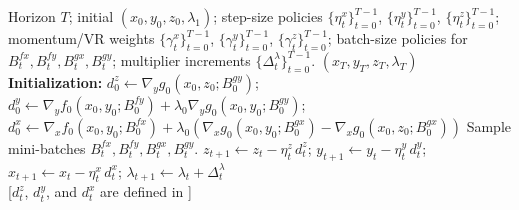\documentclass{uai2026} %
\begin{document}
\begin{algorithm}[t]
\caption{Variance-Reduced SF$^2$OBO (VR--SF$^2$OBO)}
\label{alg:vr-sf2obo}
\begin{algorithmic}[1]
  \Input Horizon $T$; initial $(x_0,y_0,z_0,\lambda_1)$; step-size policies $\{\eta_t^x\}_{t=0}^{T-1}$, $\{\eta_t^y\}_{t=0}^{T-1}$, $\{\eta_t^z\}_{t=0}^{T-1}$; momentum/VR weights $\{\gamma_t^x\}_{t=0}^{T-1}$, $\{\gamma_t^y\}_{t=0}^{T-1}$, $\{\gamma_t^z\}_{t=0}^{T-1}$; batch-size policies for $B_t^{fx},B_t^{fy},B_t^{gx},B_t^{gy}$; multiplier increments $\{\Delta_t^\lambda\}_{t=0}^{T-1}$.
  \Output $(x_{T},y_{T},z_{T},\lambda_{T})$
  \Statex \textbf{Initialization:} $d_0^{z}\gets \nabla_y g_0(x_0,z_0;B_0^{gy})$;\quad
         $d_0^{y}\gets \nabla_y f_0(x_0,y_0;B_0^{fy})+\lambda_0\nabla_y g_0(x_0,y_0;B_0^{gy})$;
  \State $d_0^{x}\gets \nabla_x f_0(x_0,y_0;B_0^{fx})+\lambda_0\!\left(\nabla_x g_0(x_0,y_0;B_0^{gx})-\nabla_x g_0(x_0,z_0;B_0^{gx})\right)$
    \State Sample mini-batches $B_t^{fx},B_t^{fy},B_t^{gx},B_t^{gy}$.
    \State $z_{t+1}\gets z_t-\eta_t^z\, d_t^{z}$;\quad
           $y_{t+1}\gets y_t-\eta_t^y\, d_t^{y}$;\quad
           $x_{t+1}\gets x_t-\eta_t^x\, d_t^{x}$;\quad
           $\lambda_{t+1}\gets \lambda_t+\Delta_t^\lambda$\\
           \hspace{0.5cm}[$d_t^{z}$, $d_t^{y}$, and $d_{t}^{x}$ are defined in ]
  \EndFor
\end{algorithmic}
\end{algorithm}
\end{document}
